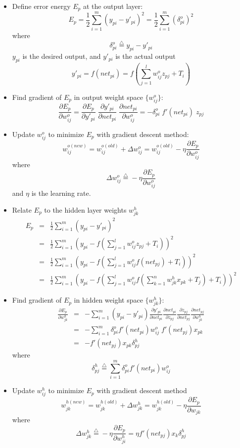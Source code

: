 \begin{itemize}
\item Define error energy $E_p$ at the output layer:
	\[	
	E_p=\frac{1}{2}\sum_{i=1}^m (y_{pi}-y'_{pi})^2=\frac{1}{2} \sum_{i=1}^m (\delta_{pi}^{o})^2
	\]
	where
	\[
	\delta_{pi}^{o} \stackrel{\triangle}{=}y_{pi}-y'_{pi}
	\]
	$y_{pi}$ is the desired output, and $y'_{pi}$ is the actual output
	\[
	y'_{pi}=f(net_{pi})=f(\sum_{j=1}^l w^{o}_{ij} z_{pj}+T_i)
	\]
\item Find gradient of $E_p$ in output weight space $\{w_{ij}^{o}\}$:
	\[
	\frac{\partial E_p}{\partial w_{ij}^{o}}
	=\frac{\partial E_p}{\partial y'_{pi}}\;
	 \frac{\partial y'_{pi}}{\partial net_{pi}}\;
	 \frac{\partial net_{pi}}{\partial w_{ij}^{o}}
	=-\delta_{pi}^{o}\;f'(net_{pi})\;z_{pj}
	\]
\item Update $w_{ij}^{o}$ to minimize $E_p$ with gradient descent method:
	\[
	w_{ij}^{o(new)}
	=w_{ij}^{o(old)}+\Delta w_{ij}^{o}
	=w_{ij}^{o(old)} -\eta \frac{\partial E_p}{\partial w_{ij}^{o}}
	\]
	where
	\[	
	\Delta w_{ij}^{o}\stackrel{\triangle}{=}-\eta \frac{\partial E_p}{\partial w_{ij}^{o}}
	\]
	and $\eta$ is the learning rate.
\item Relate $E_p$ to the hidden layer weights $w_{jk}^{h}$
	\begin{eqnarray}
	E_p & = & \frac{1}{2}\sum_{i=1}^m(y_{pi}-y'_{pi})^2 \nonumber \\
 	    & = & \frac{1}{2}\sum_{i=1}^m(y_{pi}-f(\sum_{j=1}^lw_{ij}^{o}z_{pj}+T_i))^2
		 \nonumber \\
	  & = & \frac{1}{2}\sum_{i=1}^m(y_{pi}-f(\sum_{j=1}^lw_{ij}^{o}f(net_{pj})+T_i))^2
		 \nonumber \\
	  & = & \frac{1}{2}\sum_{i=1}^m(y_{pi}-f(\sum_{j=1}^lw_{ij}^{o}f(\sum_{k=1}^nw_{jk}^{h}x_{pk}+T_j)+T_i))^2
		\nonumber
	\end{eqnarray}
\item Find gradient of $E_p$ in hidden weight space $\{w_{jk}^{h}\}$:
	\begin{eqnarray}
	\frac{\partial E_p}{\partial w_{jk}^{h}}
	& = & -\sum_{i=1}^m(y_{pi}-y'_{pi})\frac{\partial y'_{pi}}{\partial net_{pi}} 
		\frac{\partial net_{pi}}{\partial z_{pj}}
		\frac{\partial z_{pj}}{\partial net_{pj}}
		\frac{\partial net_{pj}}{\partial w_{jk}^{h}}
		\nonumber \\
	& = & -\sum_{i=1}^m \delta_{pi}^{o} f'(net_{pi})w_{ij}^{o}\;f'(net_{pj})x_{pk} 
		\nonumber \\
	& = & -f'(net_{pj})x_{pk} \delta_{pj}^{h}
		\nonumber
	\end{eqnarray}
	where 
	\[
	\delta_{pj}^{h} \stackrel{\triangle}{=}\sum_{i=1}^m \delta_{pi}^{o} f'(net_{pi})w_{ij}^{o}
	\]
\item Update $w_{ij}^{h}$ to minimize $E_p$ with gradient descent method
	\[
	w_{jk}^{h(new)}
	=w_{jk}^{h(old)}+\Delta w_{jk}^{h}
	=w_{jk}^{h(old)} -\eta \frac{\partial E_p}{\partial w_{jk}}
	\]
	where
	\[
	\Delta w_{jk}^{h}\stackrel{\triangle}{=}
	-\eta \frac{\partial E_p}{\partial w_{ji}^{h}}
	=\eta f'(net_{pj}) x_k \delta_{pj}^{h}
	\]
\end{itemize}

